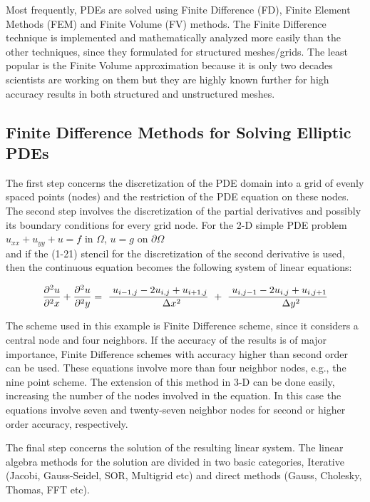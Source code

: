 Most frequently, PDEs are solved using Finite Difference (FD), Finite Element Methods (FEM) and Finite Volume (FV) methods. The Finite Difference technique is implemented and mathematically analyzed more easily than the other techniques, since they formulated for structured meshes/grids. The least popular is the Finite Volume approximation because it is only two decades scientists are working on them but they are highly known further for high accuracy results in both structured and unstructured meshes.

\subsection{Finite Difference Methods for Solving Elliptic PDEs}
The first step concerns the discretization of the PDE domain into a grid of evenly spaced points (nodes) and the restriction of the PDE equation on these nodes. The second step involves the discretization of the partial derivatives and possibly its boundary conditions for every grid node. For the 2-D simple PDE problem\\
$u_{xx}+u_{yy}+ u=f$   in $\Omega$,   $u=g$ on   $\partial  \Omega $ \\
and if the (1-21) stencil for the discretization of the second derivative is used, then the continuous equation becomes the following system of linear equations:

\[ \frac{\partial^2 u}{\partial^2 x} + \frac{\partial^2 u}{\partial^2 y}
   = \ \frac{\ u_{i-1,j} -2u_{i,j} + u_{i+1,j} }{\\\Delta x^2}\ + \ \frac{\ u_{i,j-1} -2u_{i,j} + u_{i,j+1} }{\\\Delta y^2}\]
      
The scheme used in this example is Finite Difference scheme, since it considers a central node and four neighbors. If the accuracy of the results is of major importance, Finite Difference schemes with accuracy higher than second order can be used. These equations involve more than four neighbor nodes, e.g., the nine point scheme. The extension of this method in 3-D can be done easily, increasing the number of the nodes involved in the equation. In this case the equations involve seven and twenty-seven neighbor nodes for second or higher order accuracy, respectively. 

The final step concerns the solution of the resulting linear system. The linear algebra methods for the solution  are divided in two basic categories, Iterative (Jacobi, Gauss-Seidel, SOR, Multigrid etc) and direct methods (Gauss, Cholesky, Thomas, FFT etc).

